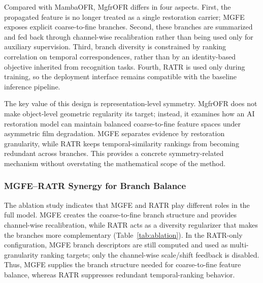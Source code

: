 \documentclass[symmetry,article,submit,pdftex,moreauthors]{Definitions/mdpi}
\begin{document}
Compared with MambaOFR, MgfrOFR differs in four aspects. First, the propagated feature is no longer treated as a single restoration carrier; MGFE exposes explicit coarse-to-fine branches. Second, these branches are summarized and fed back through channel-wise recalibration rather than being used only for auxiliary supervision. Third, branch diversity is constrained by ranking correlation on temporal correspondences, rather than by an identity-based objective inherited from recognition tasks. Fourth, RATR is used only during training, so the deployment interface remains compatible with the baseline inference pipeline.

The key value of this design is representation-level symmetry. MgfrOFR does not make object-level geometric regularity its target; instead, it examines how an AI restoration model can maintain balanced coarse-to-fine feature spaces under asymmetric film degradation. MGFE separates evidence by restoration granularity, while RATR keeps temporal-similarity rankings from becoming redundant across branches. This provides a concrete symmetry-related mechanism without overstating the mathematical scope of the method.

\subsubsection{MGFE--RATR Synergy for Branch Balance}
\label{subsec:synergy}

The ablation study indicates that MGFE and RATR play different roles in the full model. MGFE creates the coarse-to-fine branch structure and provides channel-wise recalibration, while RATR acts as a diversity regularizer that makes the branches more complementary (Table~\ref{tab:ablation}). In the RATR-only configuration, MGFE branch descriptors are still computed and used as multi-granularity ranking targets; only the channel-wise scale/shift feedback is disabled. Thus, MGFE supplies the branch structure needed for coarse-to-fine feature balance, whereas RATR suppresses redundant temporal-ranking behavior.
\end{document}
